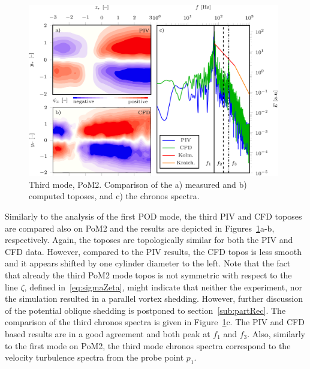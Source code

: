 {\begin{figure}[htbp]
    \centering
    \includegraphics[width=0.98\textwidth]{02_images/00_export/figure14.png}
    \caption{{Third mode, PoM2.} Comparison of the a) measured and b) computed toposes, and c) the chronos spectra.}
    \label{fig:pom2mod3}
\end{figure}
{Similarly to the analysis of the first POD mode}, the third PIV and CFD toposes are compared also on PoM2 {and the results are depicted} in Figures~\ref{fig:pom2mod3}a-b, respectively. Again, the {toposes are topologically} similar for both {the} PIV and CFD data. However, {compared to the PIV results,} the {CFD} topos is less smooth and it appears shifted by one cylinder diameter to the left. {Note that the fact that already the third PoM2 mode topos is not symmetric with respect to the line $\zeta$, defined in~\eqref{eq:sigmaZeta}, might indicate that neither the experiment, nor the simulation resulted in a parallel vortex shedding. However, further discussion of the potential oblique shedding is postponed to section~\ref{sub:partRec}}. The comparison of the third chronos spectra is given in Figure~\ref{fig:pom2mod3}c. The {PIV} and {CFD} {based results} are {in a good agreement and both} peak at $f_1$ and $f_3$. {Also,} similarly {to} the first mode on PoM2, {the third mode chronos spectra correspond} to the velocity turbulence spectra from {the} probe point $p_1$.



}
